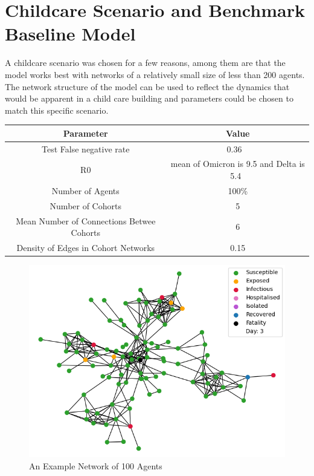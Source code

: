 \documentclass{article}
\begin{document}
\newpage
\section{Childcare Scenario and Benchmark Baseline Model}

A childcare scenario was chosen for a few reasons, among them are that the model works best with networks of a relatively small size of less than 200 agents. The network structure of the model can be used to reflect the dynamics that would be apparent in a child care building and parameters could be chosen to match this specific scenario.\newline

\begin{tabular}{|c|c|}
\hline
Parameter & Value \\ \hline
Test False negative rate & 0.36 ~\cite{van_de_mortel_2022} \\ \hline
R0 &  mean of Omicron is 9.5 and Delta is 5.4~\cite{liu_rocklov_2022} \\ \hline
Number of Agents & 100\% \\ \hline
Number of Cohorts & 5 \\ \hline
Mean Number of Connections Betwee Cohorts  & 6 \\ \hline
Density of Edges in Cohort Networks  & 0.15 \\ \hline
\end{tabular}



\begin{figure}[h!]
\centering
\includegraphics[width= 12cm]{network}
\caption{An Example Network of 100 Agents}
\end{figure}
\end{document}
